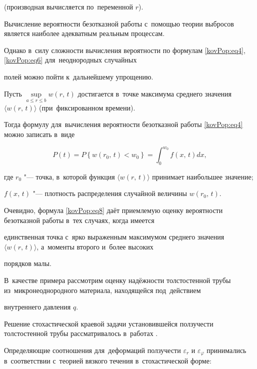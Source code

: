 (производная вычисляется по~переменной $r$).



Вычисление вероятности безотказной работы с~помощью теории выбросов является наиболее адекватным реальным процессам. 

Однако в~силу сложности вычисления вероятности по формулам \eqref{kovPop:eq4}, \eqref{kovPop:eq6} для~неоднородных случайных

полей можно пойти к~дальнейшему упрощению. 

Пусть $\mathop {\sup }\limits_{a \le r \le b} w(r,\,t)$ достигается в~точке максимума среднего значения $\langle w(r,\,t)\rangle $ (при~фиксированном времени). 

Тогда формулу для~вычисления вероятности безотказной работы \eqref{kovPop:eq4} можно записать в~виде

\begin{equation}

\label{kovPop:eq8} P(t) = P\left\{w(r_0 ,\,t) < w_0 \right\} = \int _0^{w_0}{f(x,\,t) dx},

\end{equation}

где $r_0$ "--- точка, в~которой функция $\langle w(r,\,t)\rangle$ принимает наибольшее значение; 

$f(x,\,t)$ "--- плотность распределения случайной величины $w(r_0 ,\,t)$.



Очевидно, формула \eqref{kovPop:eq8} даёт приемлемую оценку вероятности безотказной работы в~тех случаях, когда имеется

единственная точка с~ярко выраженным максимумом среднего значения $\langle w(r,\,t)\rangle $, а~моменты второго и~более высоких

порядков малы.



В~качестве примера рассмотрим оценку надёжности толстостенной трубы из~микронеоднородного материала, находящейся под~действием

внутреннего давления $q$. 

Решение стохастической краевой задачи установившейся ползучести толстостенной трубы рассматривалось в~работах \cite{KovalPopov:Dolzkovoy, KovalPopov:Isutkina}.

Определяющие соотношения для~деформаций ползучести $\varepsilon_r$ и $\varepsilon_{\varphi}$ принимались в~соответствии с~теорией вязкого течения в~стохастической форме:

$$

